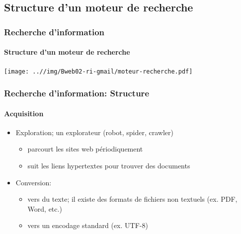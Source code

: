 \documentclass[xcolor=table]{beamer}
\begin{document}
\subsection{Structure d'un moteur de recherche}

\begin{frame}
\frametitle{Recherche d'information}
\framesubtitle{Structure d'un moteur de recherche}

\begin{center}
	\texttt{[image: ..//img/Bweb02-ri-gmail/moteur-recherche.pdf]}
\end{center}

\end{frame}

\begin{frame}
\frametitle{Recherche d'information: Structure}
\framesubtitle{Acquisition}

\begin{itemize}
	\item Exploration; un explorateur (robot, spider, crawler)
	\begin{itemize}
		\item parcourt les sites web périodiquement 
		\item suit les liens hypertextes pour trouver des documents
	\end{itemize}

	\item Conversion:
	\begin{itemize}
		\item vers du texte; il existe des formats de fichiers non textuels (ex. PDF, Word, etc.)
		\item vers un encodage standard (ex. UTF-8)
	\end{itemize}
\end{itemize}

\end{frame}
\end{document}
